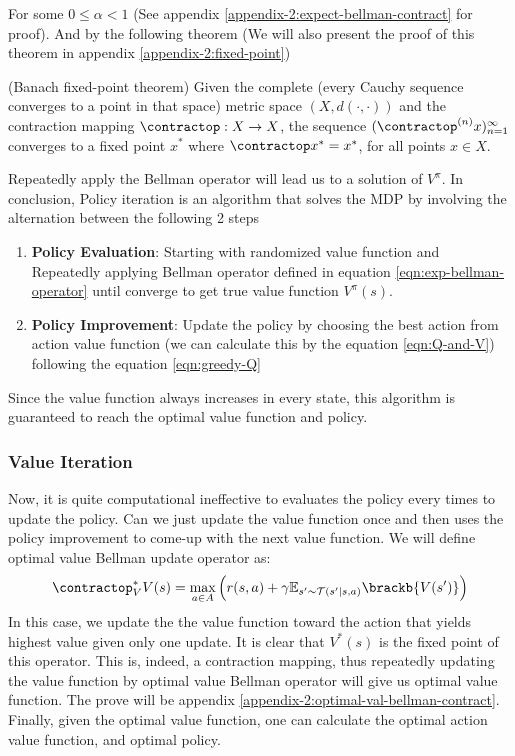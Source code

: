 For some $0 \le \alpha < 1$ (See appendix \ref{appendix-2:expect-bellman-contract} for proof). And by the following theorem (We will also present the proof of this theorem in appendix \ref{appendix-2:fixed-point}) 
\begin{theorem}{(Banach fixed-point theorem)}
    Given the complete (every Cauchy sequence converges to a point in that space) metric space $(X, d(\cdot, \cdot))$ and the contraction mapping $\contractop : X \rightarrow X$, the sequence $(\contractop^{(n)} x)^{\infty}_{n=1}$ converges to a fixed point $x^*$ where $\contractop x^* = x^*$, for all points $x \in X$. 
\end{theorem}
Repeatedly apply the Bellman operator will lead us to a solution of $V^{\pi}$.  In conclusion, Policy iteration is an algorithm that solves the MDP by involving the alternation between the following 2 steps
\begin{enumerate}
    \item \textbf{Policy Evaluation}: Starting with randomized value function and Repeatedly applying Bellman operator defined in equation \ref{eqn:exp-bellman-operator} until converge to get true value function $V^{\pi}(s)$.
    \item \textbf{Policy Improvement}: Update the policy by choosing the best action from action value function (we can calculate this by the equation \ref{eqn:Q-and-V}) following the equation \ref{eqn:greedy-Q}
\end{enumerate}
Since the value function always increases in every state, this algorithm is guaranteed to reach the optimal value function and policy. 

\subsubsection{Value Iteration}
Now, it is quite computational ineffective to evaluates the policy every times to update the policy. Can we just update the value function once and then uses the policy improvement to come-up with the next value function. We will define optimal value Bellman update operator as:
\begin{equation}
    \label{eqn:optimal-bellman-operator}
    \contractop^*_V V(s) = \max_{a \in A}\Big(r(s, a) + \gamma \mathbb{E}_{s' \sim \mathcal{T}(s' | s, a)}\brackb{V(s')} \Big)
\end{equation}
In this case, we update the the value function toward the action that yields highest value given only one update. It is clear that $V^*(s)$ is the fixed point of this operator. This is, indeed, a contraction mapping, thus repeatedly updating the value function by optimal value Bellman operator will give us optimal value function. The prove will be appendix \ref{appendix-2:optimal-val-bellman-contract}. Finally, given the optimal value function, one can calculate the optimal action value function, and optimal policy. 

